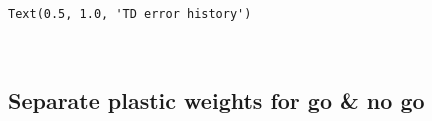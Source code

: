 \documentclass[11pt]{article}
\newcommand{\prompt}[4]{
        \llap{{\color{#2}[#3]: #4}}\vspace{-1.25em}
    }
\begin{document}
            \begin{tcolorbox}[breakable, boxrule=.5pt, size=fbox, pad at break*=1mm, opacityfill=0]
\prompt{Out}{outcolor}{22}{\hspace{3.5pt}}
\begin{Verbatim}[commandchars=\\\{\}]
Text(0.5, 1.0, 'TD error history')
\end{Verbatim}
\end{tcolorbox}
        
    \begin{center}
    \end{center}
    { \hspace*{\fill} \\}
    
    \hypertarget{separate-plastic-weights-for-go-no-go}{%
\subsection{Separate plastic weights for go \& no
go}\label{separate-plastic-weights-for-go-no-go}}
\end{document}
